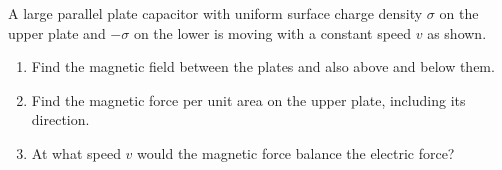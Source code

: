 \documentclass[fleqn, a4paper, 11pt, oneside]{amsart}
\theoremstyle{definition}
\theoremstyle{theorem}
\begin{document}
\begin{question}
	A large parallel plate capacitor with uniform surface charge density $\sigma$ on the upper plate and $-\sigma$ on the lower is moving with a constant speed $v$ as shown.
	\begin{figure}[H]
	\end{figure}
	\begin{enumerate}
		\item Find the magnetic field between the plates and also above and below them.
		\item Find the magnetic force per unit area on the upper plate, including its direction.
		\item At what speed $v$ would the magnetic force balance the electric force?
	\end{enumerate}
\end{question}
\end{document}
